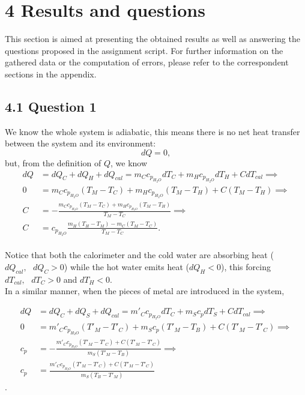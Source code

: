 \documentclass[a4paper, 12pt]{article}
\begin{document}
	\section{4 Results and questions}
	This section is aimed at presenting the obtained results as well as answering the questions proposed in the assignment script. For further information on the gathered data or the computation of errors, please refer to the correspondent sections in the appendix.
	\subsection{4.1 Question 1}
	We know the whole system is adiabatic, this means there is no net heat transfer between the system and its environment:
	\begin{equation}
		dQ = 0 \nonumber,
	\end{equation}
	but, from the definition of $Q$, we know
	\begin{align*}
		dQ &= dQ_C + dQ_H + dQ_{cal} = m_C c_{p_{H_2O}} dT_C + m_H c_{p_{H_2O}} dT_H + C dT_{cal}  \implies \\ 
		0 &= m_C c_{p_{H_2O}} (T_M - T_C) + m_H c_{p_{H_2O}} (T_M - T_H) + C (T_M - T_H) \implies \\
		C &= -\frac{m_C c_{p_{H_2O}} (T_M - T_C) + m_H c_{p_{H_2O}} (T_M - T_H)}{T_M - T_C}  \implies \\
		C & = c_{p_{H_2O}} \frac{m_H  (T_H - T_M) - m_C (T_M - T_C)}{T_M - T_C}.
	\end{align*}\\

	Notice that both the calorimeter and the cold water are absorbing heat ($dQ_{cal}, \mbox{ } dQ_C > 0$) while the hot water emits heat ($dQ_H < 0$), this forcing $dT_{cal}, \mbox{ } dT_C > 0$ and $dT_H < 0$. \\
	
	In a similar manner, when the pieces of metal are introduced in the system,
	
	\begin{align*}
		dQ &= dQ_C + dQ_S + dQ_{cal} = m'_C c_{p_{H_2O}} dT_C + m_S c_p dT_S + C dT_{cal} \implies \\
		0 &= m'_Cc_{p_{H_2O}}(T'_M - T'_C) + m_S c_p (T'_M - T_B) + C(T'_M - T'_C) \implies \\
		c_p &= -\frac{m'_Cc_{p_{H_2O}}(T'_M - T'_C) + C(T'_M - T'_C)}{m_S(T'_M - T_B)} \implies \\
		c_p &= \frac{m'_Cc_{p_{H_2O}}(T'_M - T'_C) + C(T'_M - T'_C)}{m_S(T_B - T'_M)} 
	\end{align*}.\\
\end{document}
